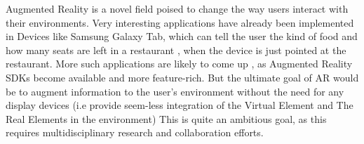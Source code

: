 Augmented Reality is a novel field poised to change the way users 
interact with their environments. Very interesting applications 
have already been implemented in Devices like Samsung Galaxy Tab, which can
tell the user the kind of food and how many seats are left in a restaurant
, when the device is just pointed at the restaurant.
More such applications are likely to come up , as Augmented Reality SDKs
become available and more feature-rich.
But the ultimate goal of AR would be to augment information to the user's
environment without the need for any display devices (i.e provide seem-less
integration of the Virtual Element and The Real Elements in the environment)
This is quite an ambitious goal, as this requires multidisciplinary research
and collaboration efforts.